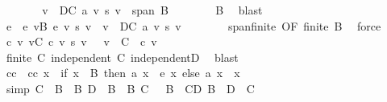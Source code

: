 \begin{isabellebody}
\ \ \ \ \isamarkupfalse%
\ \isamarkupfalse%
\ {\isachardoublequoteopen}{\isacharparenleft}{\kern0pt}{\isasymSum}v\ {\isasymin}\ D{\isacharminus}{\kern0pt}C{\isachardot}{\kern0pt}\ a\ v\ {\isacharasterisk}{\kern0pt}s\ v{\isacharparenright}{\kern0pt}\ {\isasymin}\ span\ B{\isachardoublequoteclose}\isanewline
\ \ \ \ \ \ \isamarkupfalse%
\ B\ \isamarkupfalse%
\ blast\isanewline
\ \ \ \ \isamarkupfalse%
\ \isamarkupfalse%
\ e\ \ e{\isacharcolon}{\kern0pt}\ {\isachardoublequoteopen}{\isacharparenleft}{\kern0pt}{\isasymSum}v{\isasymin}B{\isachardot}{\kern0pt}\ e\ v\ {\isacharasterisk}{\kern0pt}s\ v{\isacharparenright}{\kern0pt}\ {\isacharequal}{\kern0pt}\ {\isacharparenleft}{\kern0pt}{\isasymSum}v\ {\isasymin}\ D{\isacharminus}{\kern0pt}C{\isachardot}{\kern0pt}\ a\ v\ {\isacharasterisk}{\kern0pt}s\ v{\isacharparenright}{\kern0pt}{\isachardoublequoteclose}\isanewline
\ \ \ \ \ \ \isamarkupfalse%
\ span{\isacharunderscore}{\kern0pt}finite\ {\isacharbrackleft}{\kern0pt}OF\ {\isacartoucheopen}finite\ B{\isacartoucheclose}{\isacharbrackright}{\kern0pt}\ \isamarkupfalse%
\ force\isanewline
\ \ \ \ \isamarkupfalse%
\ {\isachardoublequoteopen}{\isasymAnd}c\ v{\isachardot}{\kern0pt}\ {\isasymlbrakk}{\isacharparenleft}{\kern0pt}{\isasymSum}v{\isasymin}C{\isachardot}{\kern0pt}\ c\ v\ {\isacharasterisk}{\kern0pt}s\ v{\isacharparenright}{\kern0pt}\ {\isacharequal}{\kern0pt}\ {}{\isacharsemicolon}{\kern0pt}\ v\ {\isasymin}\ C{\isasymrbrakk}\ {\isasymLongrightarrow}\ c\ v\ {\isacharequal}{\kern0pt}\ {}{\isachardoublequoteclose}\isanewline
\ \ \ \ \ \ \isamarkupfalse%
\ {\isacartoucheopen}finite\ C{\isacartoucheclose}\ {\isacartoucheopen}independent\ C{\isacartoucheclose}\ independentD\ \isamarkupfalse%
\ blast\isanewline
\ \ \ \ \isamarkupfalse%
\ cc\ \ {\isachardoublequoteopen}cc\ x\ {\isacharequal}{\kern0pt}\ {\isacharparenleft}{\kern0pt}if\ x\ {\isasymin}\ B\ then\ a\ x\ {\isacharplus}{\kern0pt}\ e\ x\ else\ a\ x{\isacharparenright}{\kern0pt}{\isachardoublequoteclose}\ \ x\isanewline
\ \ \ \ \isamarkupfalse%
\ {\isacharbrackleft}{\kern0pt}simp{\isacharbrackright}{\kern0pt}{\isacharcolon}{\kern0pt}\ {\isachardoublequoteopen}C\ {\isasyminter}\ B\ {\isacharequal}{\kern0pt}\ B{\isachardoublequoteclose}\ {\isachardoublequoteopen}D\ {\isasyminter}\ B\ {\isacharequal}{\kern0pt}\ B{\isachardoublequoteclose}\ {\isachardoublequoteopen}C\ {\isasyminter}\ {\isacharminus}{\kern0pt}\ B\ {\isacharequal}{\kern0pt}\ C{\isacharminus}{\kern0pt}D{\isachardoublequoteclose}\ {\isachardoublequoteopen}B\ {\isasyminter}\ {\isacharparenleft}{\kern0pt}D\ {\isacharminus}{\kern0pt}\ C{\isacharparenright}{\kern0pt}\ {\isacharequal}{\kern0pt}\ {\isacharbraceleft}{\kern0pt}{\isacharbraceright}{\kern0pt}{\isachardoublequoteclose}\isanewline

\end{isabellebody}
